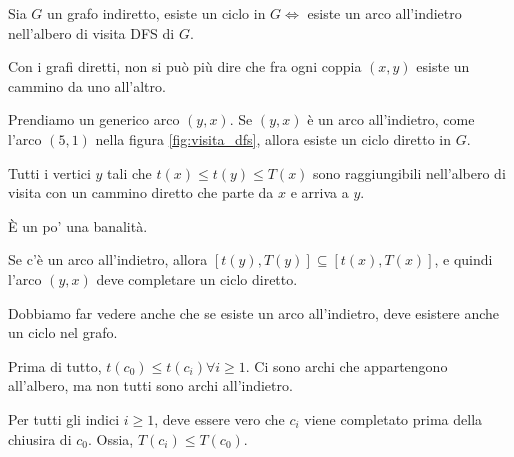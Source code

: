 \begin{prop}
Sia $G$ un grafo indiretto, esiste un ciclo in $G \iff $ esiste un arco all'indietro nell'albero di visita DFS di $G$.
\end{prop}

Con i grafi diretti, non si pu\`o pi\`u dire che fra ogni coppia $(x,y)$ esiste un cammino da uno all'altro.

Prendiamo un generico arco $(y,x)$. Se $(y,x)$ \`e un arco all'indietro, come l'arco $(5,1)$ nella figura \ref{fig:visita_dfs}, allora esiste un ciclo diretto in $G$.

\begin{oss}
Tutti i vertici $y$ tali che $t(x) \le t(y) \le T(x)$ sono raggiungibili nell'albero di visita con un cammino diretto che parte da $x$ e arriva a $y$.
\end{oss}
\`E un po' una banalit\`a.

Se c'\`e un arco all'indietro, allora $[t(y), T(y)] \subseteq [t(x), T(x)]$, e quindi l'arco $(y,x)$ deve completare un ciclo diretto.

Dobbiamo far vedere anche che se esiste un arco all'indietro, deve esistere anche un ciclo nel grafo.

\begin{figure}
\centering
{}
\end{figure}

Prima di tutto, $t(c_0) \le t(c_i) \forall i \ge 1$. Ci sono archi che appartengono all'albero, ma non tutti sono archi all'indietro.

\begin{claim}
Per tutti gli indici $i \ge 1$, deve essere vero che $c_i$ viene completato prima della chiusira di $c_0$. Ossia, $T(c_i) \le T(c_0)$.
\end{claim}

